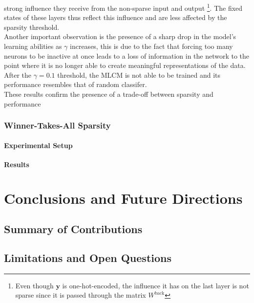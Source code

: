 \documentclass[a4paper,12pt]{report}
\begin{document}
strong influence they receive from the non-sparse input and output
\footnote{Even though $\mathbf{y}$ is one-hot-encoded, 
the influence it has on the last layer is not sparse since it is passed through the 
matrix $W^{\mathrm{back}}$}. The fixed states of these layers thus reflect this 
influence and are less affected by the sparsity threshold. \\
Another important observation is the presence of a sharp drop in the model's learning 
abilities as $\gamma$ increases, this is due to the fact that forcing too many neurons 
to be inactive at once leads to a loss of information in the network to the point 
where it is no longer able to create meaningful representations of the data. After the 
$\gamma = 0.1$ threshold, the MLCM is not able to be trained and its performance resembles 
that of random classifer. \\
These results confirm the presence of a trade-off between sparsity and performance
\subsection{Winner-Takes-All Sparsity}

\subsubsection*{Experimental Setup}
\subsubsection*{Results}

\chapter{Conclusions and Future Directions}
\section{Summary of Contributions}
\section{Limitations and Open Questions}




\appendix
\end{document}
